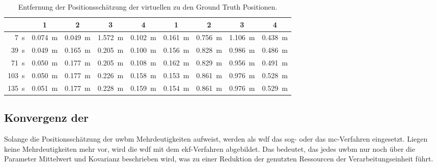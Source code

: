 \begin{table}
	\centering
	\begin{tabular}{||r||c|c|c|c||c|c|c|c||}
		\hline
 & 1 & 2 & 3 & 4 & 1 & 2 & 3 & 4 \\
\hline
\SI{7}{\second} & \SI{0.074}{\meter} & \SI{0.049}{\meter} & \SI{1.572}{\meter} & \SI{0.102}{\meter} & \SI{0.161}{\meter} & \SI{0.756}{\meter} & \SI{1.106}{\meter} & \SI{0.438}{\meter} \\
\SI{39}{\second} & \SI{0.049}{\meter} & \SI{0.165}{\meter} & \SI{0.205}{\meter} & \SI{0.100}{\meter} & \SI{0.156}{\meter} & \SI{0.828}{\meter} & \SI{0.986}{\meter} & \SI{0.486}{\meter} \\
\SI{71}{\second} & \SI{0.050}{\meter} & \SI{0.177}{\meter} & \SI{0.205}{\meter} & \SI{0.108}{\meter} & \SI{0.162}{\meter} & \SI{0.829}{\meter} & \SI{0.956}{\meter} & \SI{0.491}{\meter} \\
\SI{103}{\second} & \SI{0.050}{\meter} & \SI{0.177}{\meter} & \SI{0.226}{\meter} & \SI{0.158}{\meter} & \SI{0.153}{\meter} & \SI{0.861}{\meter} & \SI{0.976}{\meter} & \SI{0.528}{\meter} \\
\SI{135}{\second} & \SI{0.051}{\meter} & \SI{0.177}{\meter} & \SI{0.228}{\meter} & \SI{0.159}{\meter} & \SI{0.154}{\meter} & \SI{0.861}{\meter} & \SI{0.976}{\meter} & \SI{0.529}{\meter} \\
\hline
	\end{tabular}
	\caption{Entfernung der Positionsschätzung der virtuellen  zu den Ground Truth Positionen.}
	\label{tab:distance_between_virtual_uwb_and_gt}
\end{table}


%
%
\subsection{Konvergenz der }

Solange die Positionsschätzung der \gls{uwbm} Mehrdeutigkeiten aufweist, werden als \gls{wdf} das \gls{sog}- oder das \gls{mc}-Verfahren eingesetzt. Liegen keine Mehrdeutigkeiten mehr vor, wird die \gls{wdf} mit dem \gls{ekf}-Verfahren abgebildet. Das bedeutet, das jedes \gls{uwbm} nur noch über die Parameter Mittelwert und Kovarianz beschrieben wird, was zu einer Reduktion der genutzten Ressourcen der Verarbeitungseinheit führt.

